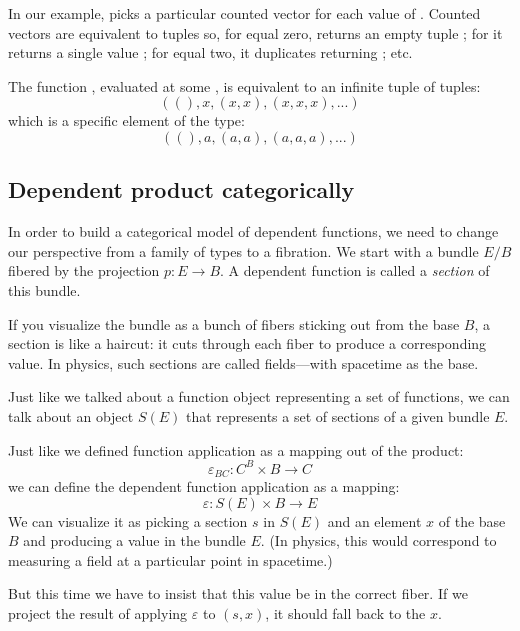 \documentclass[DaoFP]{subfiles}
\begin{document}
In our example,  picks a particular counted vector for each value of . Counted vectors are equivalent to tuples so, for  equal zero,  returns an empty tuple \hask{()}; for  it returns a single value ; for  equal two, it duplicates  returning ; etc. 

The function , evaluated at some ,  is equivalent to an infinite tuple of tuples:
\[ ((), x, (x, x), (x, x, x), ...) \]
which is a specific element of the type:
\[ ((), a, (a, a), (a, a, a), ...) \]

\subsection{Dependent product categorically}
In order to build a categorical model of dependent functions, we need to change our perspective from a family of types to a fibration. We start with a bundle $E/B$ fibered by the projection $p\colon E \to B$. A dependent function is called a \emph{section} of this bundle. 

If you visualize the bundle as a bunch of fibers sticking out from the base $B$, a section is like a haircut: it cuts through each fiber to produce a corresponding value. In physics, such sections are called fields---with spacetime as the base. 

Just like we talked about a function object representing a set of functions, we can talk about an object $S(E)$ that represents a set of sections of a given bundle $E$. 

Just like we defined function application as a mapping out of the product:
\[\varepsilon_{B C} \colon C^B \times B \to C\]
we can define the dependent function application as a mapping:
\[\varepsilon \colon S(E) \times B \to E\]
We can visualize it as picking a section $s$ in $S(E)$ and an element $x$ of the base $B$ and producing a value in the bundle $E$. (In physics, this would correspond to measuring a field at a particular point in spacetime.)

But this time we have to insist that this value be in the correct fiber. If we project the result of applying $\varepsilon$ to $(s, x)$, it should fall back to the $x$. 
\end{document}
